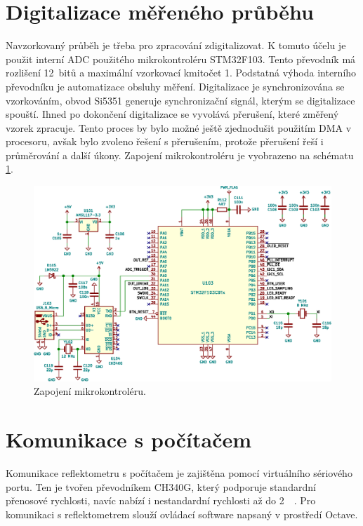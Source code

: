 \section{Digitalizace měřeného průběhu}
Navzorkovaný průběh je třeba pro zpracování zdigitalizovat. K tomuto účelu je použit interní \acrshort{ADC} použitého mikrokontroléru STM32F103. Tento převodník má rozlišení 12~bitů a maximální vzorkovací kmitočet \SI{1}{\megasample}. Podstatná výhoda interního převodníku je automatizace obsluhy měření. Digitalizace je synchronizována se vzorkováním, obvod Si5351 generuje synchronizační signál, kterým se digitalizace spouští. Ihned po dokončení digitalizace se vyvolává přerušení, které změřený vzorek zpracuje. Tento proces by bylo možné ještě zjednodušit použitím DMA v procesoru, avšak bylo zvoleno řešení s přerušením, protože přerušení řeší i průměrování a další úkony. Zapojení mikrokontroléru je vyobrazeno na schématu \ref{microcontroller_section}.

\begin{figure}[htbp]
\includegraphics[width=\textwidth,keepaspectratio]{images/microcontroller_section.eps}\caption{Zapojení mikrokontroléru.}\label{microcontroller_section}
\end{figure}

\section{Komunikace s počítačem}
Komunikace reflektometru s počítačem je zajištěna pomocí virtuálního sériového portu. Ten je tvořen převodníkem CH340G, který podporuje standardní přenosové rychlosti, navíc nabízí i nestandardní rychlosti až do \SI{2}{\mega\baud}. Pro komunikaci s reflektometrem slouží ovládací software napsaný v prostředí Octave.

